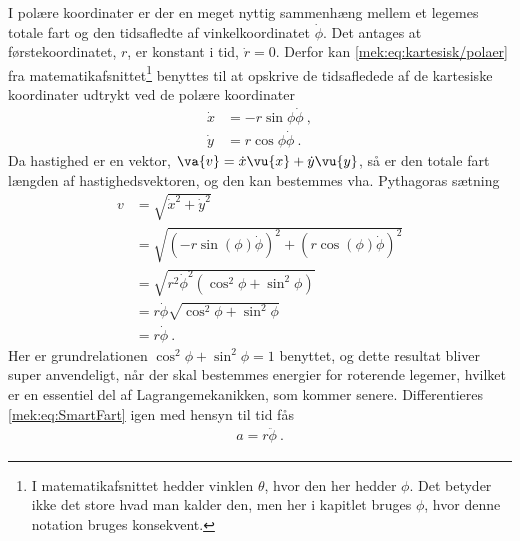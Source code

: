 I polære koordinater er der en meget nyttig sammenhæng mellem et legemes totale fart og den tidsafledte af vinkelkoordinatet $\dot{\phi}$. Det antages at førstekoordinatet, $r$, er konstant i tid, $\dot{r} = 0$. Derfor kan \cref{mek:eq:kartesisk/polaer} fra matematikafsnittet\footnote{I matematikafsnittet hedder vinklen $\theta$, hvor den her hedder $\phi$. Det betyder ikke det store hvad man kalder den, men her i kapitlet bruges $\phi$, hvor denne notation bruges konsekvent.} benyttes til at opskrive de tidsafledede af de kartesiske koordinater udtrykt ved de polære koordinater
%
\begin{equation}
\begin{aligned}
	\dot{x} &= -r\sin\phi\dot{\phi} \: , \\
	\dot{y} &= r\cos\phi\dot{\phi} \: .
\end{aligned}
\end{equation}
%
Da hastighed er en vektor, $\va{v} = \dot{x} \vu{x} + \dot{y} \vu{y}$, så er den totale fart længden af hastighedsvektoren, og den kan bestemmes vha. Pythagoras sætning
%
\begin{equation} \label{mek:eq:SmartFart}
\begin{aligned}
	v &= \sqrt{\dot{x}^2 + \dot{y}^2} \\
	&= \sqrt{(-r\sin(\phi)\dot{\phi})^2 + (r\cos(\phi)\dot{\phi})^2} \\
	&= \sqrt{r^2\dot{\phi}^2(\cos^2\phi + \sin^2\phi)} \\
	&= r\dot{\phi}\sqrt{\cos^2\phi + \sin^2\phi} \\
	&= r\dot{\phi} \: .
\end{aligned}
\end{equation}
%
Her er grundrelationen $\cos^2\phi + \sin^2\phi = 1$ benyttet, og dette resultat bliver super anvendeligt, når der skal bestemmes energier for roterende legemer, hvilket er en essentiel del af Lagrangemekanikken, som kommer senere. Differentieres \cref{mek:eq:SmartFart} igen med hensyn til tid fås
\begin{align}
	a = r\ddot{\phi} \: .
\end{align}

